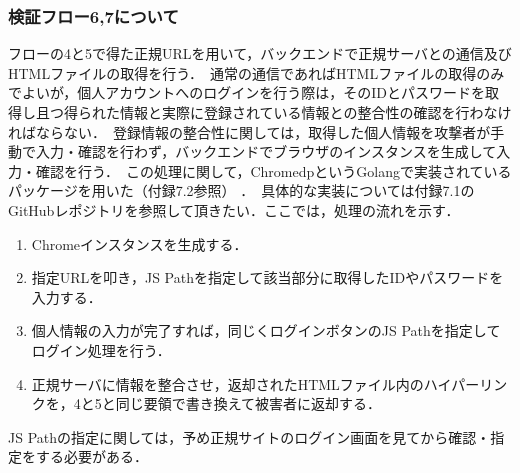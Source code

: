 \documentclass[dvipdfmx,twocolumn]{jsarticle}
\begin{document}
            \subsubsection{検証フロー6,7について}
                フローの4と5で得た正規URLを用いて，バックエンドで正規サーバとの通信及びHTMLファイルの取得を行う．\
                通常の通信であればHTMLファイルの取得のみでよいが，個人アカウントへのログインを行う際は，そのIDとパスワードを取得し且つ得られた情報と実際に登録されている情報との整合性の確認を行わなければならない．\
                登録情報の整合性に関しては，取得した個人情報を攻撃者が手動で入力・確認を行わず，バックエンドでブラウザのインスタンスを生成して入力・確認を行う．\
                この処理に関して，ChromedpというGolangで実装されているパッケージを用いた（付録7.2参照） ．\
                具体的な実装については付録7.1のGitHubレポジトリを参照して頂きたい．ここでは，処理の流れを示す．\
                \begin{enumerate}
                    \item Chromeインスタンスを生成する．
                    \item 指定URLを叩き，JS Pathを指定して該当部分に取得したIDやパスワードを入力する．
                    \item 個人情報の入力が完了すれば，同じくログインボタンのJS Pathを指定してログイン処理を行う．
                    \item 正規サーバに情報を整合させ，返却されたHTMLファイル内のハイパーリンクを，4と5と同じ要領で書き換えて被害者に返却する．
                \end{enumerate}
                JS Pathの指定に関しては，予め正規サイトのログイン画面を見てから確認・指定をする必要がある．\
                \clearpage
\end{document}
